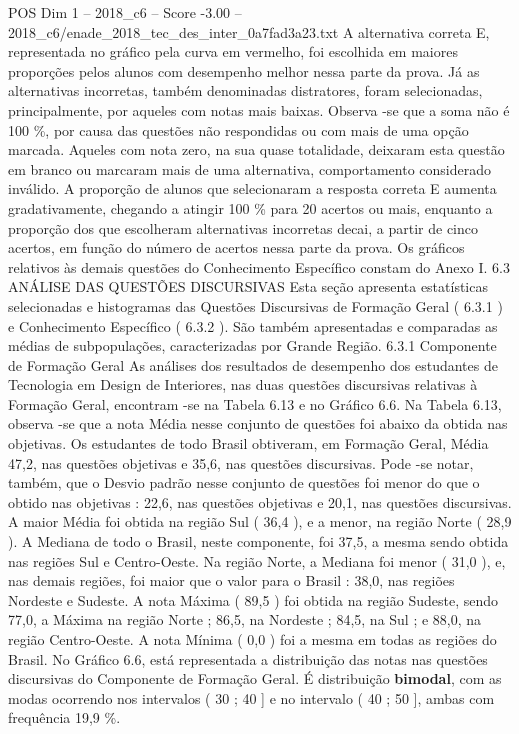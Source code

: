 \begin{textsample}{POS Dim 1 – 2018\_c6 – Score -3.00 – 2018\_c6/enade\_2018\_tec\_des\_inter\_0a7fad3a23.txt}
A alternativa correta E, representada no gráfico pela curva em vermelho, foi escolhida em maiores proporções pelos alunos com desempenho melhor nessa parte da prova.
Já as alternativas incorretas, também denominadas distratores, foram selecionadas, principalmente, por aqueles com notas mais baixas.
Observa -se que a soma não é 100 \%, por causa das questões não respondidas ou com mais de uma opção marcada.
Aqueles com nota zero, na sua quase totalidade, deixaram esta questão em branco ou marcaram mais de uma alternativa, comportamento considerado inválido.
A proporção de alunos que selecionaram a resposta correta E aumenta gradativamente, chegando a atingir 100 \% para 20 acertos ou mais, enquanto a proporção dos que escolheram alternativas incorretas decai, a partir de cinco acertos, em função do número de acertos nessa parte da prova.
Os gráficos relativos às demais questões do Conhecimento Específico constam do Anexo I. 6.3 ANÁLISE DAS QUESTÕES DISCURSIVAS Esta seção apresenta estatísticas selecionadas e histogramas das Questões Discursivas de Formação Geral ( 6.3.1 ) e Conhecimento Específico ( 6.3.2 ).
São também apresentadas e comparadas as médias de subpopulações, caracterizadas por Grande Região. 6.3.1 Componente de Formação Geral As análises dos resultados de desempenho dos estudantes de Tecnologia em Design de Interiores, nas duas questões discursivas relativas à Formação Geral, encontram -se na Tabela 6.13 e no Gráfico 6.6.
Na Tabela 6.13, observa -se que a nota Média nesse conjunto de questões foi abaixo da obtida nas objetivas.
Os estudantes de todo Brasil obtiveram, em Formação Geral, Média 47,2, nas questões objetivas e 35,6, nas questões discursivas.
Pode -se notar, também, que o Desvio padrão nesse conjunto de questões foi menor do que o obtido nas objetivas : 22,6, nas questões objetivas e 20,1, nas questões discursivas.
A maior Média foi obtida na região Sul ( 36,4 ), e a menor, na região Norte ( 28,9 ).
A Mediana de todo o Brasil, neste componente, foi 37,5, a mesma sendo obtida nas regiões Sul e Centro-Oeste.
Na região Norte, a Mediana foi menor ( 31,0 ), e, nas demais regiões, foi maior que o valor para o Brasil : 38,0, nas regiões Nordeste e Sudeste.
A nota Máxima ( 89,5 ) foi obtida na região Sudeste, sendo 77,0, a Máxima na região Norte ; 86,5, na Nordeste ; 84,5, na Sul ; e 88,0, na região Centro-Oeste.
A nota Mínima ( 0,0 ) foi a mesma em todas as regiões do Brasil.
No Gráfico 6.6, está representada a distribuição das notas nas questões discursivas do Componente de Formação Geral.
É distribuição \textbf{bimodal}, com as modas ocorrendo nos intervalos ( 30 ; 40 ] e no intervalo ( 40 ; 50 ], ambas com frequência 19,9 \%.

\end{textsample}
